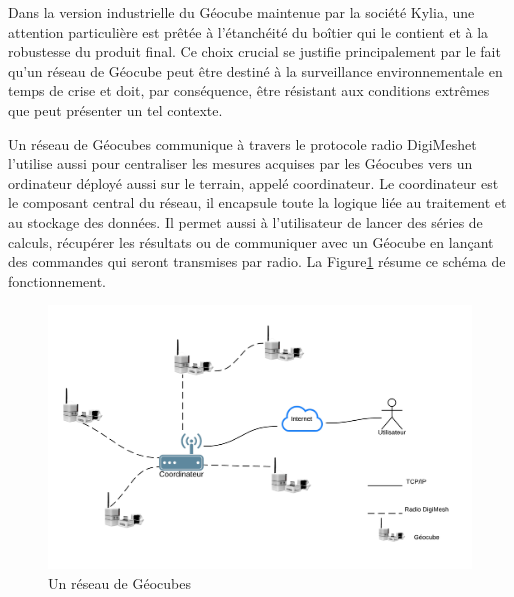 \documentclass{themeensg}
\begin{document}
Dans la version industrielle du Géocube maintenue par la société Kylia, une attention particulière est prêtée à l'étanchéité du boîtier qui le contient et à la robustesse du produit final. Ce choix crucial se justifie principalement par le fait qu'un réseau de Géocube peut être destiné à la surveillance environnementale en temps de crise et doit, par conséquence, être résistant aux conditions extrêmes que peut présenter un tel contexte.

Un réseau de Géocubes communique à travers le protocole radio DigiMesh\textcopyright et l'utilise aussi pour centraliser les mesures acquises par les Géocubes vers un ordinateur déployé aussi sur le terrain, appelé coordinateur. Le coordinateur est le composant central du réseau, il encapsule toute la logique liée au traitement et au stockage des données. Il permet aussi à l'utilisateur de lancer des séries de calculs, récupérer les résultats ou de communiquer avec un Géocube en lançant des commandes qui seront transmises par radio. La Figure\ref{fig:geocube_network} résume ce schéma de fonctionnement.

\begin{figure}[h!]
\centering
\includegraphics[scale=0.8]{images/fig1.png}
\caption{Un réseau de Géocubes}
\label{fig:geocube_network}
\end{figure}
\end{document}
